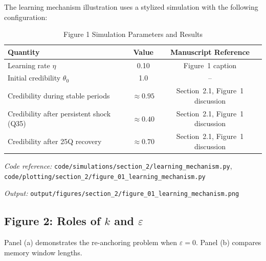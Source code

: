 \documentclass[11pt]{article}
\begin{document}
The learning mechanism illustration uses a stylized simulation with the following configuration:

\begin{table}[htbp]
\centering
\caption{Figure 1 Simulation Parameters and Results}
\label{tab:fig1_results}
\begin{threeparttable}
\begin{tabular}{lcc}
\toprule
Quantity & Value & Manuscript Reference \\
\midrule
Learning rate $\eta$ & 0.10 & Figure~1 caption \\
Initial credibility $\theta_0$ & 1.0 & -- \\
Credibility during stable periods & $\approx 0.95$ & Section~2.1, Figure~1 discussion \\
Credibility after persistent shock (Q35) & $\approx 0.40$ & Section~2.1, Figure~1 discussion \\
Credibility after 25Q recovery & $\approx 0.70$ & Section~2.1, Figure~1 discussion \\
\bottomrule
\end{tabular}
\begin{tablenotes}
\small
\item \textit{Code reference:} \texttt{code/simulations/section\_2/learning\_mechanism.py}, \texttt{code/plotting/section\_2/figure\_01\_learning\_mechanism.py}
\item \textit{Output:} \texttt{output/figures/section\_2/figure\_01\_learning\_mechanism.png}
\end{tablenotes}
\end{threeparttable}
\end{table}

\subsection{Figure 2: Roles of $k$ and $\varepsilon$}

Panel (a) demonstrates the re-anchoring problem when $\varepsilon = 0$. Panel (b) compares memory window lengths.
\end{document}
